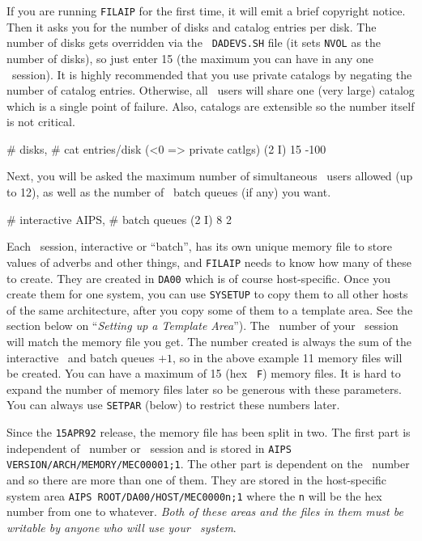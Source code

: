 If you are running {\tt FILAIP} for the first time, it will emit a brief
copyright notice.  Then it asks you for the number of disks and catalog
entries per disk.  The number of disks gets overridden via the {\tt
DADEVS.SH} file (it sets {\tt NVOL} as the number of disks), so just
enter 15 (the maximum you can have in any one \AIPS\ session).  It is
highly recommended that you use private catalogs by negating the number
of catalog entries.  Otherwise, all \AIPS\ users will share one (very
large) catalog which is a single point of failure.  Also, catalogs are
extensible so the number itself is not critical.\medskip

\fortran
# disks, # cat entries/disk (<0 => private catlgs) (2 I)
15 -100
\endfortran

\medskip\noindent Next, you will be asked the maximum number of
simultaneous \AIPS\ users allowed (up to 12), as well as the number of
\AIPS\ batch queues (if any) you want. \medskip

\fortran
# interactive AIPS, # batch queues (2 I)
8 2
\endfortran

\medskip\noindent Each \AIPS\ session, interactive or ``batch'', has
its own unique memory file to store values of adverbs and other things,
and {\tt FILAIP} needs to know how many of these to create.  They are
created in {\tt\dol DA00} which is of course host-specific.  Once you
create them for one system, you can use {\tt SYSETUP} to copy them to
all other hosts of the same architecture, after you copy some of them to
a template area.  See the section below on ``{\it Setting up a Template
Area}'').  The \POPS\ number of your \AIPS\ session will match the
memory file you get.  The number created is always the sum of the
interactive \AIPS\ and batch queues $+ 1$, so in the above example 11
memory files will be created.  You can have a maximum of 15 (hex {\tt
F}) memory files.  It is hard to expand the number of memory files later
so be generous with these parameters.  You can always use {\tt SETPAR}
(below) to restrict these numbers later.

Since the {\tt 15APR92} release, the memory file has been split in two.
The first part is independent of \POPS\ number or \AIPS\ session and
is stored in {\tt\dol AIPS VERSION/\dol ARCH/MEMORY/MEC00001;1}.  The
other part is dependent on the \POPS\ number and so there are more than
one of them.  They are stored in the host-specific system area
{\tt\dol AIPS ROOT/DA00/\dol HOST/MEC0000n;1} where the {\tt n} will be the
hex number from one to whatever.  {\it Both of these areas and the files
in them must be writable by anyone who will use your \AIPS\ system\/}.

